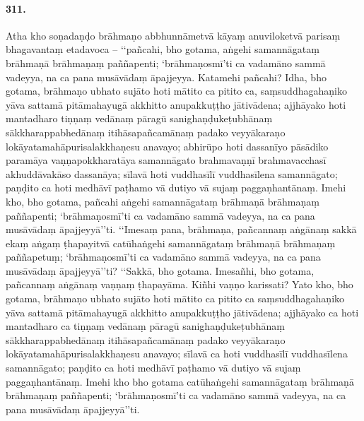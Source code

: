 \paragraph{311.} Atha kho soṇadaṇḍo brāhmaṇo abbhunnāmetvā kāyaṃ anuviloketvā parisaṃ bhagavantaṃ etadavoca – ‘‘pañcahi, bho gotama, aṅgehi samannāgataṃ brāhmaṇā brāhmaṇaṃ paññapenti; ‘brāhmaṇosmī’ti ca vadamāno sammā vadeyya, na ca pana musāvādaṃ āpajjeyya. Katamehi pañcahi? Idha, bho gotama, brāhmaṇo ubhato sujāto hoti mātito ca pitito ca, saṃsuddhagahaṇiko yāva sattamā pitāmahayugā akkhitto anupakkuṭṭho jātivādena; ajjhāyako hoti mantadharo tiṇṇaṃ vedānaṃ pāragū sanighaṇḍukeṭubhānaṃ sākkharappabhedānaṃ itihāsapañcamānaṃ padako veyyākaraṇo lokāyatamahāpurisalakkhaṇesu anavayo; abhirūpo hoti dassanīyo pāsādiko paramāya vaṇṇapokkharatāya samannāgato brahmavaṇṇī brahmavacchasī akhuddāvakāso dassanāya; sīlavā hoti vuddhasīlī vuddhasīlena samannāgato; paṇḍito ca hoti medhāvī paṭhamo vā dutiyo vā sujaṃ paggaṇhantānaṃ. Imehi kho, bho gotama, pañcahi aṅgehi samannāgataṃ brāhmaṇā brāhmaṇaṃ paññapenti; ‘brāhmaṇosmī’ti ca vadamāno sammā vadeyya, na ca pana musāvādaṃ āpajjeyyā’’ti. ‘‘Imesaṃ pana, brāhmaṇa, pañcannaṃ aṅgānaṃ sakkā ekaṃ aṅgaṃ ṭhapayitvā catūhaṅgehi samannāgataṃ brāhmaṇā brāhmaṇaṃ paññapetuṃ; ‘brāhmaṇosmī’ti ca vadamāno sammā vadeyya, na ca pana musāvādaṃ āpajjeyyā’’ti? ‘‘Sakkā, bho gotama. Imesañhi, bho gotama, pañcannaṃ aṅgānaṃ vaṇṇaṃ ṭhapayāma. Kiñhi vaṇṇo karissati? Yato kho, bho gotama, brāhmaṇo ubhato sujāto hoti mātito ca pitito ca saṃsuddhagahaṇiko yāva sattamā pitāmahayugā akkhitto anupakkuṭṭho jātivādena; ajjhāyako ca hoti mantadharo ca tiṇṇaṃ vedānaṃ pāragū sanighaṇḍukeṭubhānaṃ sākkharappabhedānaṃ itihāsapañcamānaṃ padako veyyākaraṇo lokāyatamahāpurisalakkhaṇesu anavayo; sīlavā ca hoti vuddhasīlī vuddhasīlena samannāgato; paṇḍito ca hoti medhāvī paṭhamo vā dutiyo vā sujaṃ paggaṇhantānaṃ. Imehi kho bho gotama catūhaṅgehi samannāgataṃ brāhmaṇā brāhmaṇaṃ paññapenti; ‘brāhmaṇosmī’ti ca vadamāno sammā vadeyya, na ca pana musāvādaṃ āpajjeyyā’’ti.

